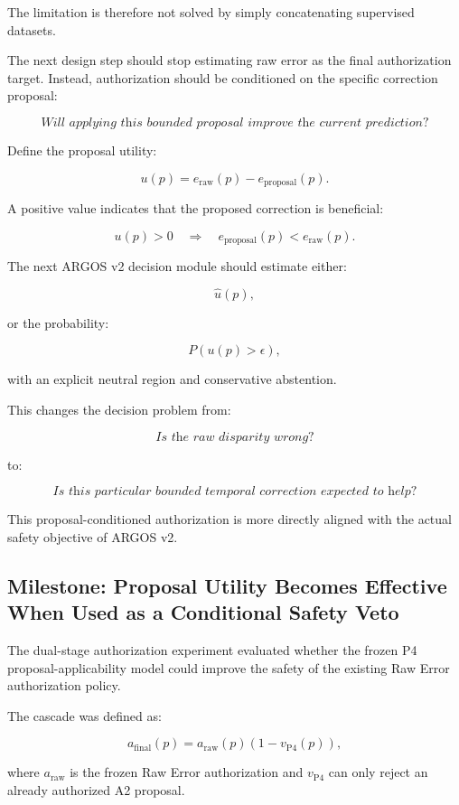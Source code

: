 \documentclass[11pt,a4paper]{article}
\begin{document}
The limitation is therefore not solved by simply concatenating supervised datasets.

The next design step should stop estimating raw error as the final authorization target. Instead, authorization should be conditioned on the specific correction proposal:

\[
\textit{Will applying this bounded proposal improve the current prediction?}
\]

Define the proposal utility:

\[
u(p)
=
e_{\mathrm{raw}}(p)
-
e_{\mathrm{proposal}}(p).
\]

A positive value indicates that the proposed correction is beneficial:

\[
u(p)>0
\quad\Longrightarrow\quad
e_{\mathrm{proposal}}(p)<e_{\mathrm{raw}}(p).
\]

The next ARGOS v2 decision module should estimate either:

\[
\hat u(p),
\]

or the probability:

\[
P
\left(
u(p)>\epsilon
\right),
\]

with an explicit neutral region and conservative abstention.

This changes the decision problem from:

\[
\textit{Is the raw disparity wrong?}
\]

to:

\[
\boxed{
\textit{Is this particular bounded temporal correction expected to help?}
}
\]

This proposal-conditioned authorization is more directly aligned with the actual safety objective of ARGOS v2.

\subsection{Milestone: Proposal Utility Becomes Effective When Used as a Conditional Safety Veto}

The dual-stage authorization experiment evaluated whether the frozen P4 proposal-applicability model could improve the safety of the existing Raw Error authorization policy.

The cascade was defined as:

\[
a_{\mathrm{final}}(p)
=
a_{\mathrm{raw}}(p)
\left(
1-v_{\mathrm{P4}}(p)
\right),
\]

where \(a_{\mathrm{raw}}\) is the frozen Raw Error authorization and \(v_{\mathrm{P4}}\) can only reject an already authorized A2 proposal.
\end{document}
